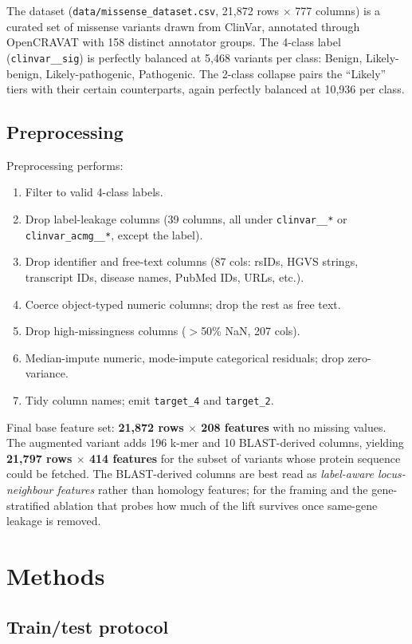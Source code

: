 \documentclass[11pt,a4paper]{article}
\begin{document}
The dataset (\texttt{data/missense\_dataset.csv}, 21{,}872 rows $\times$ 777 columns)
is a curated set of missense variants drawn from ClinVar, annotated through
OpenCRAVAT with 158 distinct annotator groups. The 4-class label
(\texttt{clinvar\_\_sig}) is perfectly balanced at 5{,}468 variants per class:
Benign, Likely-benign, Likely-pathogenic, Pathogenic. The 2-class collapse pairs the
``Likely'' tiers with their certain counterparts, again perfectly balanced at 10{,}936
per class.

\subsection{Preprocessing}

Preprocessing performs:
\begin{enumerate}[leftmargin=*]
 \item Filter to valid 4-class labels.
 \item Drop label-leakage columns (39 columns, all under \texttt{clinvar\_\_*} or
 \texttt{clinvar\_acmg\_\_*}, except the label).
 \item Drop identifier and free-text columns (87 cols: rsIDs, HGVS strings,
 transcript IDs, disease names, PubMed IDs, URLs, etc.).
 \item Coerce object-typed numeric columns; drop the rest as free text.
 \item Drop high-missingness columns ($>$50\% NaN, 207 cols).
 \item Median-impute numeric, mode-impute categorical residuals; drop zero-variance.
 \item Tidy column names; emit \texttt{target\_4} and \texttt{target\_2}.
\end{enumerate}
Final base feature set: \textbf{21{,}872 rows $\times$ 208 features} with no missing values.
The augmented variant adds 196 k-mer and 10 BLAST-derived columns, yielding
\textbf{21{,}797 rows $\times$ 414 features} for the subset of variants whose protein
sequence could be fetched. The BLAST-derived columns are best read as
\emph{label-aware locus-neighbour features} rather than homology features; for the framing and the gene-stratified ablation
that probes how much of the lift survives once same-gene leakage is removed.

\section{Methods}

\subsection{Train/test protocol}
\end{document}
